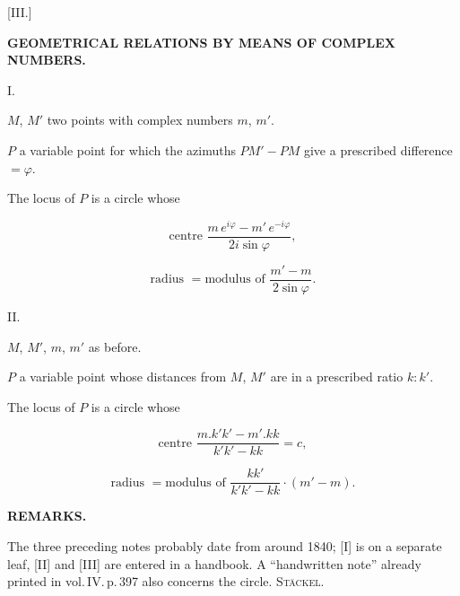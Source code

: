 
\begin{center}
[III.]

\textbf{GEOMETRICAL RELATIONS BY MEANS OF COMPLEX NUMBERS.}

I.
\end{center}

$M$, $M'$ two points with complex numbers $m$, $m'$.

$P$ a variable point for which the azimuths $PM'-PM$ give a prescribed
difference $= \varphi$.

The locus of $P$ is a circle whose

\[
\text{centre } \frac{m\,e^{i\varphi}-m'\,e^{-i\varphi}}{2i\sin\varphi},
\]

\[
\text{radius } = \text{modulus of } \frac{m'-m}{2\sin\varphi}.
\]

\begin{center}
II.
\end{center}

$M$, $M'$, $m$, $m'$ as before.

$P$ a variable point whose distances from $M$, $M'$ are in a prescribed ratio $k:k'$.

The locus of $P$ is a circle whose

\[
\text{centre } \frac{m.k'k'-m'.kk}{k'k'-kk} = c,
\]

\[
\text{radius } = \text{modulus of } \frac{kk'}{k'k'-kk}\cdot(m'-m).
\]



\begin{center}
\textbf{REMARKS.}
\end{center}

The three preceding notes probably date from around 1840;
[I] is on a separate leaf, [II] and [III] are entered in a handbook.
A “handwritten note” already printed in vol.\,IV.\,p.\,397 also concerns
the circle. \hfill \textsc{Stäckel}.
